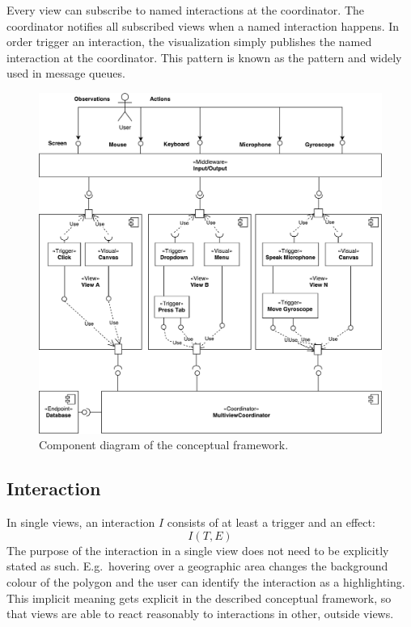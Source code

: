 Every view can subscribe to named interactions at the coordinator.
The coordinator notifies all subscribed views when a named interaction happens.
In order trigger an interaction, the visualization simply publishes the named interaction at the coordinator.
This pattern is known as the  pattern and widely used in message queues.


\begin{figure}[ht]
  \centering
  \includegraphics[width=\textwidth]{figures/concept/Concept}
  \caption{%
    Component diagram of the conceptual framework.
  }\label{fig:concept:component-diagram}
\end{figure}


\subsection{Interaction}
In single views, an interaction $I$ consists of at least a trigger and an effect:
\begin{equation}
  I(T, E)
\end{equation}
The purpose of the interaction in a single view does not need to be explicitly stated as such.
E.g.\ hovering over a geographic area changes the background colour of the polygon and the user can identify the interaction as a highlighting.
This implicit meaning gets explicit in the described conceptual framework, so that views are able to react reasonably to interactions in other, outside views.

